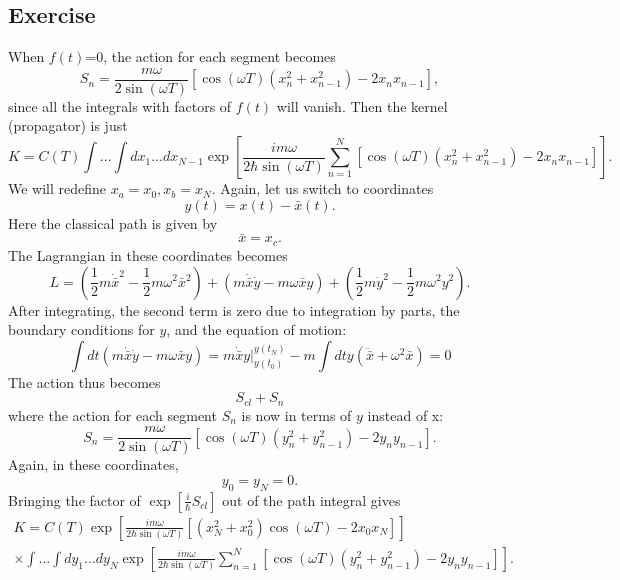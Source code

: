 \subsection{Exercise}
 When $f(t)$=0, the action for each segment becomes
 \begin{equation} 
    \label{action}
     S_{n}=\frac{m\omega}{2\sin(\omega T)}[\cos(\omega T)(x_n^2+x_{n-1}^2)-2x_nx_{n-1}],
 \end{equation}
 since all the integrals with factors of $f(t)$ will vanish. Then the kernel (propagator) is just
 \begin{equation}
     K=C(T)\int...\int dx_1...dx_{N-1}\exp[\frac{i m\omega}{2\hbar\sin(\omega T)}\sum_{n=1}^N[\cos(\omega T)(x_n^2+x_{n-1}^2)-2x_nx_{n-1}]].
 \end{equation}
We will redefine $x_a=x_0, x_b=x_N$. Again, let us switch to coordinates 
\begin{equation}
    y(t)=x(t)-\bar x(t).
\end{equation}
Here the classical path is given by 
\begin{equation}
    \bar x = x_c.
\end{equation}
The Lagrangian in these coordinates becomes
\begin{equation}
    L=(\frac 1 2 m \dot{\bar x}^2-\frac 1 2 m\omega^2 \bar x^2)+(m\dot{\bar x}\dot y -m \omega \bar x y)+(\frac 1 2 m \dot y ^2 -\frac 1 2 m \omega^2y^2).
\end{equation}
After integrating, the second term is zero due to integration by parts, the boundary conditions for $y$, and the equation of motion:
\begin{equation}
    \int dt( m\dot{\bar x}\dot y -m \omega \bar x y) = m\dot{\bar x} y |_{y(t_0)}^{y(t_N)}-m\int dt y(\ddot{\bar x}+\omega^2 \bar x)=0
\end{equation}
The action thus becomes
\begin{equation}
    S_{cl}+S_n
\end{equation}
where the action for each segment $S_n$ is now in terms of $y$ instead of x:
\begin{equation}
    S_{n}=\frac{m\omega}{2\sin(\omega T)}[\cos(\omega T)(y_n^2+y_{n-1}^2)-2y_ny_{n-1}].
\end{equation}
Again, in these coordinates, 
\begin{equation}
    y_0=y_N=0.
\end{equation}
Bringing the factor of $\exp[\frac i \hbar S_{cl}]$ out of the path integral gives
\begin{align}
    K=C(T)\exp[\frac{i m \omega}{2\hbar\sin(\omega T)}[(x_N^2+x_0^2)\cos(\omega T)-2x_0x_N]]\\ \times \int...\int dy_1...dy_N\exp[\frac{i m\omega}{2\hbar\sin(\omega T)}\sum_{n=1}^N[\cos(\omega T)(y_n^2+y_{n-1}^2)-2y_ny_{n-1}]].
\end{align}
